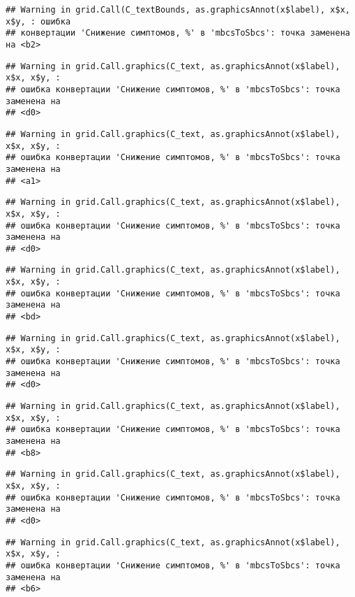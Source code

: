 \documentclass[
]{article}
\begin{document}
\begin{verbatim}
## Warning in grid.Call(C_textBounds, as.graphicsAnnot(x$label), x$x, x$y, : ошибка
## конвертации 'Снижение симптомов, %' в 'mbcsToSbcs': точка заменена на <b2>
\end{verbatim}

\begin{verbatim}
## Warning in grid.Call.graphics(C_text, as.graphicsAnnot(x$label), x$x, x$y, :
## ошибка конвертации 'Снижение симптомов, %' в 'mbcsToSbcs': точка заменена на
## <d0>
\end{verbatim}

\begin{verbatim}
## Warning in grid.Call.graphics(C_text, as.graphicsAnnot(x$label), x$x, x$y, :
## ошибка конвертации 'Снижение симптомов, %' в 'mbcsToSbcs': точка заменена на
## <a1>
\end{verbatim}

\begin{verbatim}
## Warning in grid.Call.graphics(C_text, as.graphicsAnnot(x$label), x$x, x$y, :
## ошибка конвертации 'Снижение симптомов, %' в 'mbcsToSbcs': точка заменена на
## <d0>
\end{verbatim}

\begin{verbatim}
## Warning in grid.Call.graphics(C_text, as.graphicsAnnot(x$label), x$x, x$y, :
## ошибка конвертации 'Снижение симптомов, %' в 'mbcsToSbcs': точка заменена на
## <bd>
\end{verbatim}

\begin{verbatim}
## Warning in grid.Call.graphics(C_text, as.graphicsAnnot(x$label), x$x, x$y, :
## ошибка конвертации 'Снижение симптомов, %' в 'mbcsToSbcs': точка заменена на
## <d0>
\end{verbatim}

\begin{verbatim}
## Warning in grid.Call.graphics(C_text, as.graphicsAnnot(x$label), x$x, x$y, :
## ошибка конвертации 'Снижение симптомов, %' в 'mbcsToSbcs': точка заменена на
## <b8>
\end{verbatim}

\begin{verbatim}
## Warning in grid.Call.graphics(C_text, as.graphicsAnnot(x$label), x$x, x$y, :
## ошибка конвертации 'Снижение симптомов, %' в 'mbcsToSbcs': точка заменена на
## <d0>
\end{verbatim}

\begin{verbatim}
## Warning in grid.Call.graphics(C_text, as.graphicsAnnot(x$label), x$x, x$y, :
## ошибка конвертации 'Снижение симптомов, %' в 'mbcsToSbcs': точка заменена на
## <b6>
\end{verbatim}
\end{document}
